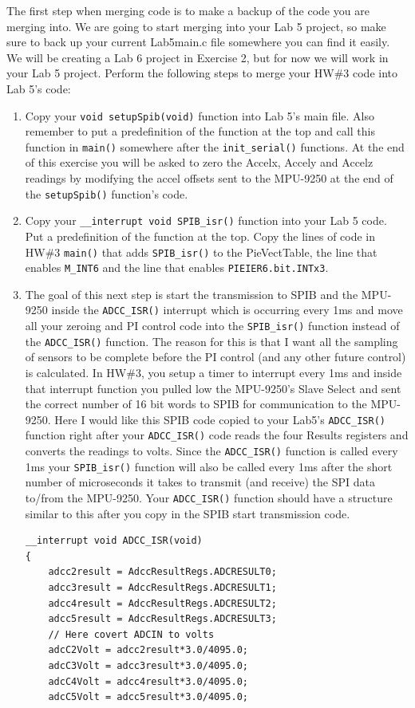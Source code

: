 \documentclass[11pt]{article}
\begin{document}
The first step when merging code is to make a backup of the code you are merging into. We are going to start merging into your Lab 5 project, so make sure to back up your current Lab5main.c file somewhere you can find it easily. We will be creating a Lab 6 project in Exercise 2, but for now we will work in your Lab 5 project. Perform the following steps to merge your HW\#3 code into Lab 5’s code:
%
\begin{enumerate}
        \item Copy your \texttt{void setupSpib(void)} function into Lab 5’s main file. Also remember to put a predefinition of the function at the top and call this function in \texttt{main()} somewhere after the \texttt{init_serial()} functions. At the end of this exercise you will be asked to zero the Accelx, Accely and Accelz readings by modifying the accel offsets sent to the MPU-9250 at the end of the \texttt{setupSpib()} function’s code.
        \item Copy your \texttt{__interrupt void SPIB_isr()} function into your Lab 5 code. Put a predefinition of the function at the top. Copy the lines of code in HW\#3 \texttt{main()} that adds \texttt{SPIB_isr()} to the PieVectTable, the line that enables \texttt{M_INT6} and the line that enables \texttt{PIEIER6.bit.INTx3}.
        \item The goal of this next step is start the transmission to SPIB and the MPU-9250 inside the \texttt{ADCC_ISR()} interrupt which is occurring every 1ms and move all your zeroing and PI control code into the \texttt{SPIB_isr()} function instead of the \texttt{ADCC_ISR()} function. The reason for this is that I want all the sampling of sensors to be complete before the PI control (and any other future control) is calculated. In HW\#3, you setup a timer to interrupt every 1ms and inside that interrupt function you pulled low the MPU-9250’s Slave Select and sent the correct number of 16 bit words to SPIB for communication to the MPU-9250. Here I would like this SPIB code copied to your Lab5’s \texttt{ADCC_ISR()} function right after your \texttt{ADCC_ISR()} code reads the four Results registers and converts the readings to volts. Since the \texttt{ADCC_ISR()} function is called every 1ms your \texttt{SPIB_isr()} function will also be called every 1ms after the short number of microseconds it takes to transmit (and receive) the SPI data to/from the MPU-9250. Your \texttt{ADCC_ISR()} function should have a structure similar to this after you copy in the SPIB start transmission code.
\begin{verbatim}
__interrupt void ADCC_ISR(void)
{
    adcc2result = AdccResultRegs.ADCRESULT0;
    adcc3result = AdccResultRegs.ADCRESULT1;
    adcc4result = AdccResultRegs.ADCRESULT2;
    adcc5result = AdccResultRegs.ADCRESULT3;
    // Here covert ADCIN to volts
    adcC2Volt = adcc2result*3.0/4095.0;
    adcC3Volt = adcc3result*3.0/4095.0;
    adcC4Volt = adcc4result*3.0/4095.0;
    adcC5Volt = adcc5result*3.0/4095.0;


\end{verbatim}
\end{enumerate}
\end{document}

